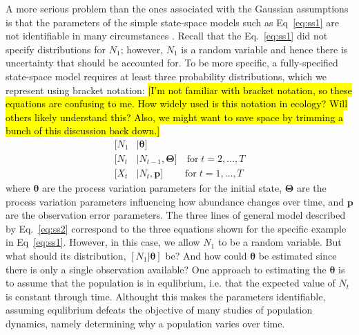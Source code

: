 \documentclass[12pt]{article}
\begin{document}
A more serious problem than the ones associated with the Gaussian
assumptions is that the parameters of the simple state-space models
such as Eq~\ref{eq:ss1} are not identifiable in many
circumstances \citep{polansky_etal:2009}. Recall that the
Eq.~\ref{eq:ss1} did not specify distributions for $N_1$; %
however, $N_1$ is a random variable and hence there is uncertainty
that should be accounted for.
To be more specific, a fully-specified state-space model requires at least
three probability distributions, which we represent
using bracket notation: \hl{[I'm not familiar with bracket notation,
  so these equations are confusing to me.  How widely used is this
  notation in ecology?  Will others likely understand this?  Also, we might want
to save space by trimming a bunch of this discussion back down.]}
\begin{subequations}
  \label{eq:ss2}
  \begin{align}
    [N_1&|\bm{\theta}] \\ \label{eq:ss2b}
    [N_t&|N_{t-1},\bm{\Theta}] \quad \text{for} \; t=2,\hdots,T \\ \label{eq:ss2c}
    [X_t&|N_t,\bm{p}]  \qquad \; \text{for} \; t=1,\hdots,T
  \end{align}
\end{subequations}
where $\bm{\theta}$ are the process variation parameters for the
initial state, $\bm{\Theta}$ are the process variation parameters
influencing how abundance changes over time, and $\bm{p}$ are the
observation error parameters. The three lines of general model
described by Eq.~\ref{eq:ss2} correspond to the three equations shown
for the specific example in Eq~\ref{eq:ss1}.  However, in this case,
we allow $N_1$ to be a random variable. But what should its
distribution, $[N_1|\bm{\theta}]$ be? And how could $\bm{\theta}$ be
estimated since there is only a single observation available?
One approach to estimating the $\bm{\theta}$ is to assume that the
population is in equlibrium, i.e. that the expected value of $N_t$ is
constant through time. Althought this makes the parameters
identifiable, assuming equlibrium defeats the objective of many
studies of population dynamics, namely determining why a population
varies over time.
\end{document}
